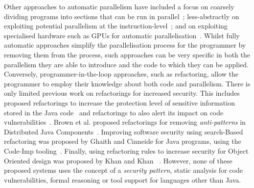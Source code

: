 \documentclass[a4paper,11pt]{article}
\begin{document}
%
Other approaches to automatic parallelism have included a focus on coarsely dividing programs into sections that can be run in parallel~\cite{DBLP:conf/pepm/LiT15,DBLP:conf/ppopp/RulVB08}; less-abstractly on exploiting potential parallelism at the instruction-level~\cite{DBLP:conf/europar/StefanovicM00}; and on exploiting specialised hardware such as GPUs for automatic parallelisation~\cite{DBLP:conf/popl/GuoTS11,DBLP:conf/pppj/LeungLL09}.
% 
%
Whilst fully automatic approaches simplify the parallelisation process for the programmer by removing them from the process, such approaches can be very specific in both the parallelism they are able to introduce and the code to which they can be applied. Conversely, programmer-in-the-loop approaches, such as refactoring, allow the programmer to employ their knowledge about both code and parallelism.
%
There is only limited previous work on refactorings for increased security. This includes proposed refactorings to increase the protection level of sensitive information stored in the Java code~\cite{maru2007} and refactorings to also alert its impact on code vulnerabilities~\cite{maru2008}.
Brown et al. proposed refactorings for removing \emph{anti-patterns} in Distributed Java Components~\cite{brown1998antipatterns}.  Improving software security using search-Based refactoring was proposed by Ghaith and Cinneide for Java programs, using the Code-Imp tooling~\cite{ghaith}. Finally, using refactoring rules to increase security for Object Oriented design was proposed by Khan and Khan~\cite{khan} . However, none of these proposed systems uses the concept of a \emph{security pattern}, static analysis for code vulnerabilities, formal reasoning or tool support for languages other than Java. 
 
\end{document}
